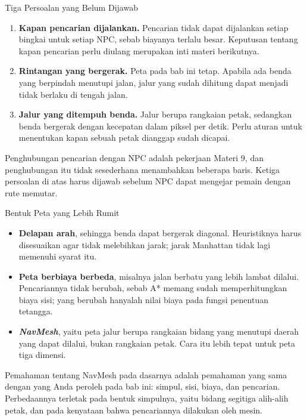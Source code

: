 \documentclass[aspectratio=169,10pt]{beamer}
\begin{document}
\begin{frame}{Tiga Persoalan yang Belum Dijawab}
\begin{enumerate}
  \item \textbf{Kapan pencarian dijalankan.} Pencarian tidak dapat dijalankan
        setiap bingkai untuk setiap NPC, sebab biayanya terlalu besar.
        Keputusan tentang kapan pencarian perlu diulang merupakan inti materi
        berikutnya.
  \item \textbf{Rintangan yang bergerak.} Peta pada bab ini tetap. Apabila ada
        benda yang berpindah menutupi jalan, jalur yang sudah dihitung dapat
        menjadi tidak berlaku di tengah jalan.
  \item \textbf{Jalur yang ditempuh benda.} Jalur berupa rangkaian petak,
        sedangkan benda bergerak dengan kecepatan dalam piksel per detik.
        Perlu aturan untuk menentukan kapan sebuah petak dianggap sudah
        dicapai.
\end{enumerate}
\vspace{0.12cm}
\begin{kotak}
Penghubungan pencarian dengan NPC adalah pekerjaan Materi 9, dan penghubungan
itu tidak sesederhana menambahkan beberapa baris. Ketiga persoalan di atas
harus dijawab sebelum NPC dapat mengejar pemain dengan rute memutar.
\end{kotak}
\end{frame}

\begin{frame}{Bentuk Peta yang Lebih Rumit}
\begin{itemize}
  \item \textbf{Delapan arah}, sehingga benda dapat bergerak diagonal.
        Heuristiknya harus disesuaikan agar tidak melebihkan jarak; jarak
        Manhattan tidak lagi memenuhi syarat itu.
  \item \textbf{Peta berbiaya berbeda}, misalnya jalan berbatu yang lebih
        lambat dilalui. Pencariannya tidak berubah, sebab A* memang sudah
        memperhitungkan biaya sisi; yang berubah hanyalah nilai biaya pada
        fungsi penentuan tetangga.
  \item \textbf{\emph{NavMesh}}, yaitu peta jalur berupa rangkaian bidang yang
        menutupi daerah yang dapat dilalui, bukan rangkaian petak. Cara itu
        lebih tepat untuk peta tiga dimensi.
\end{itemize}
\vspace{0.12cm}
\begin{kotak}
Pemahaman tentang NavMesh pada dasarnya adalah pemahaman yang sama dengan yang
Anda peroleh pada bab ini: simpul, sisi, biaya, dan pencarian. Perbedaannya
terletak pada bentuk simpulnya, yaitu bidang segitiga alih-alih petak, dan
pada kenyataan bahwa pencariannya dilakukan oleh mesin.
\end{kotak}
\end{frame}
\end{document}
